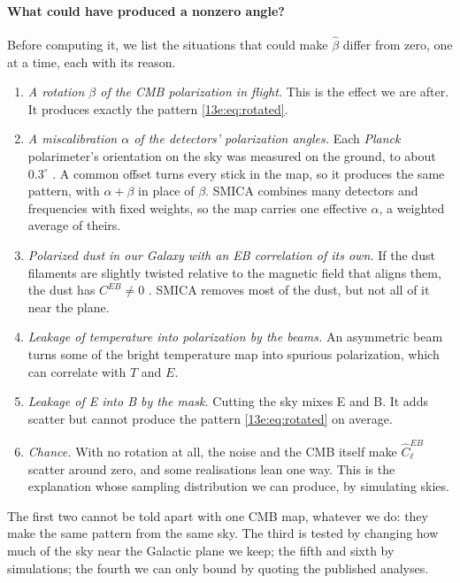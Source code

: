 \paragraph{What could have produced a nonzero angle?} Before computing it, we list the situations that
could make $\hat\beta$ differ from zero, one at a time, each with its reason.
\begin{enumerate}[itemsep=2pt,leftmargin=1.5em]
  \item \emph{A rotation $\beta$ of the CMB polarization in flight.} This is the effect we are after. It
        produces exactly the pattern \eqref{13e:eq:rotated}.
  \item \emph{A miscalibration $\alpha$ of the detectors' polarization angles.} Each \textit{Planck}
        polarimeter's orientation on the sky was measured on the ground, to about $0.3^\circ$
        \cite{PlanckIntXLIX2016}. A common offset turns every stick in the map, so it produces the same
        pattern, with $\alpha+\beta$ in place of $\beta$. SMICA combines many detectors and frequencies
        with fixed weights, so the map carries one effective $\alpha$, a weighted average of theirs.
  \item \emph{Polarized dust in our Galaxy with an EB correlation of its own.} If the dust filaments are
        slightly twisted relative to the magnetic field that aligns them, the dust has $C^{EB}\ne0$
        \cite{MinamiKomatsu2020,Clark2021}. SMICA removes most of the dust, but not all of it near the plane.
  \item \emph{Leakage of temperature into polarization by the beams.} An asymmetric beam turns some of
        the bright temperature map into spurious polarization, which can correlate with $T$ and $E$.
  \item \emph{Leakage of E into B by the mask.} Cutting the sky mixes E and B. It adds
        scatter but cannot produce the pattern \eqref{13e:eq:rotated} on average.
  \item \emph{Chance.} With no rotation at all, the noise and the CMB itself make $\widehat C^{EB}_\ell$
        scatter around zero, and some realisations lean one way. This is the explanation whose sampling
        distribution we can produce, by simulating skies.
\end{enumerate}
The first two cannot be told apart with one CMB map, whatever we do: they make the same pattern from the
same sky. The third is tested by changing how much of the sky near the Galactic plane we keep; the fifth
and sixth by simulations; the fourth we can only bound by quoting the published analyses.

